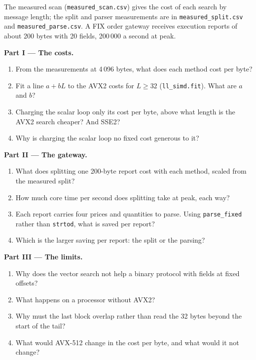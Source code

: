 \begin{problem}\label{pb:ll:vector-instructions-and-data-parallel-code:1}
The measured scan (\texttt{measured\_scan.csv}) gives the cost of each search by message length; the split and parser
measurements are in \texttt{measured\_split.csv} and \texttt{measured\_parse.csv}. A FIX order gateway receives execution
reports of about 200 bytes with 20 fields, 200\,000 a second at peak.

\medskip\noindent\textbf{Part I --- The costs.}
\begin{enumerate}
\item From the measurements at 4\,096 bytes, what does each method cost per byte?
\item Fit a line $a + bL$ to the AVX2 costs for $L \ge 32$ (\texttt{ll\_simd.fit}). What are $a$ and $b$?
\item Charging the scalar loop only its cost per byte, above what length is the AVX2 search cheaper? And SSE2?
\item Why is charging the scalar loop no fixed cost generous to it?
\end{enumerate}

\medskip\noindent\textbf{Part II --- The gateway.}
\begin{enumerate}[resume]
\item What does splitting one 200-byte report cost with each method, scaled from the measured split?
\item How much core time per second does splitting take at peak, each way?
\item Each report carries four prices and quantities to parse. Using \texttt{parse\_fixed} rather than \texttt{strtod}, what
is saved per report?
\item Which is the larger saving per report: the split or the parsing?
\end{enumerate}

\medskip\noindent\textbf{Part III --- The limits.}
\begin{enumerate}[resume]
\item Why does the vector search not help a binary protocol with fields at fixed offsets?
\item What happens on a processor without AVX2?
\item Why must the last block overlap rather than read the 32 bytes beyond the start of the tail?
\item What would AVX-512 change in the cost per byte, and what would it not change?
\end{enumerate}


\end{problem}
